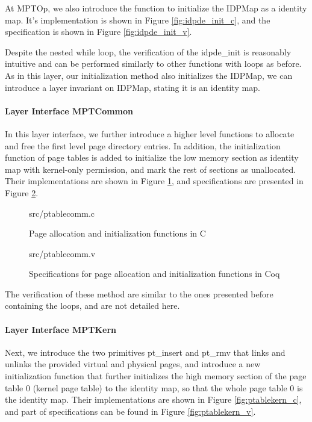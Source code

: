 At MPTOp, we also introduce the function to initialize the \textsf{IDPMap} as a identity map.
It's implementation is shown in Figure \ref{fig:idpde_init_c}, and the specification is shown
in Figure \ref{fig:idpde_init_v}.

Despite the nested while loop, the verification of the \textsf{idpde\_init} is reasonably
intuitive and can be performed similarly to other functions with loops as before.
As in this layer, our initialization method also initializes the \textsf{IDPMap}, we can
introduce a layer invariant on \textsf{IDPMap}, stating it is an identity map.


\paragraph{Layer Interface MPTCommon}

In this layer interface, we further introduce a higher level functions to allocate and free the first level page directory entries.
In addition, the initialization function of page tables is added to initialize the low memory section as identity map with kernel-only
permission, and mark the rest of sections as unallocated.
Their implementations are shown in Figure \ref{fig:ptablecomm_c}, and specifications are presented in Figure \ref{fig:ptablecomm_v}.

\begin{figure}
	 {src/ptablecomm.c}
	\caption{Page allocation and initialization functions in C}
	\label{fig:ptablecomm_c}
\end{figure}

\begin{figure}
	 {src/ptablecomm.v}
	\caption{Specifications for page allocation and initialization functions in Coq}
	\label{fig:ptablecomm_v}
\end{figure}

The verification of these method are similar to the ones presented before containing the loops, and are not detailed here.

\paragraph{Layer Interface MPTKern}

Next, we introduce the two primitives \textsf{pt\_insert} and \textsf{pt\_rmv} that links and unlinks the provided virtual and physical
pages, and introduce a new initialization function that further initializes the high memory section of the page table 0 (kernel page table)
to the identity map, so that the whole page table 0 is the identity map. Their implementations are shown in Figure
\ref{fig:ptablekern_c}, and part of specifications can be found in Figure \ref{fig:ptablekern_v}.

